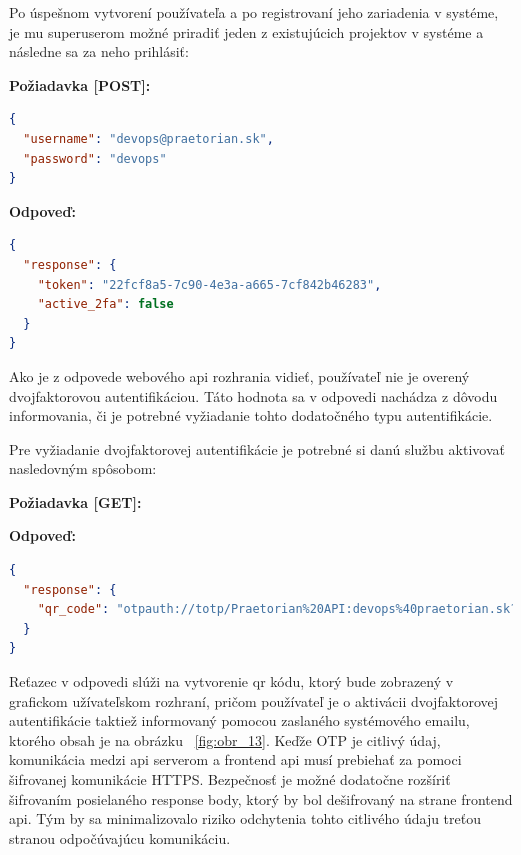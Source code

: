 Po úspešnom vytvorení používateľa a po registrovaní jeho zariadenia v systéme, je mu superuserom možné priradiť jeden z
existujúcich projektov v systéme a následne sa za neho prihlásiť:

\textbf{\large Požiadavka [POST]:}

\begin{lstlisting}[language=json,firstnumber=1]
{
  "username": "devops@praetorian.sk",
  "password": "devops"
}
\end{lstlisting}

\textbf{\large Odpoveď:}

\begin{lstlisting}[language=json,firstnumber=1]
{
  "response": {
    "token": "22fcf8a5-7c90-4e3a-a665-7cf842b46283",
    "active_2fa": false
  }
}
\end{lstlisting}

Ako je z odpovede webového api rozhrania vidieť, používateľ nie je overený dvojfaktorovou autentifikáciou.
Táto hodnota sa v odpovedi nachádza z dôvodu informovania, či je potrebné vyžiadanie tohto dodatočného typu autentifikácie.

Pre vyžiadanie dvojfaktorovej autentifikácie je potrebné si danú službu aktivovať nasledovným spôsobom:

\textbf{\large Požiadavka [GET]:}


\newpage
\textbf{\large Odpoveď:}

\begin{lstlisting}[language=json,firstnumber=1]
{
  "response": {
    "qr_code": "otpauth://totp/Praetorian%20API:devops%40praetorian.sk?secret=J4UZONZ36IQGLZAM&issuer=Praetorian%20API"
  }
}
\end{lstlisting}

Reťazec v odpovedi slúži na vytvorenie qr kódu, ktorý bude zobrazený v grafickom užívateľskom rozhraní, pričom používateľ
je o aktivácii dvojfaktorovej autentifikácie taktiež informovaný pomocou zaslaného systémového emailu, ktorého obsah
je na obrázku ~\ref{fig:obr_13}. Keďže OTP je citlivý údaj, komunikácia medzi api serverom a frontend api musí prebiehať
za pomoci šifrovanej komunikácie HTTPS.
Bezpečnosť je možné dodatočne rozšíriť šifrovaním posielaného response body, ktorý by bol dešifrovaný na strane frontend api.
Tým by sa minimalizovalo riziko odchytenia tohto citlivého údaju treťou stranou odpočúvajúcu komunikáciu.

